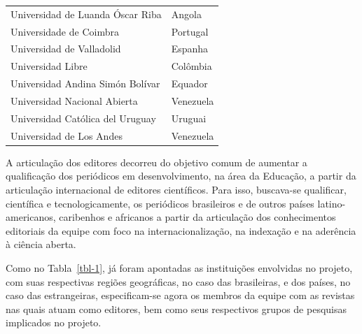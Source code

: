 \documentclass[
  a4paper,
]{book}
\begin{document}
\begin{longtable}[]{@{}ll@{}}
Universidad de Luanda Óscar Riba & Angola \\
Universidade de Coimbra & Portugal \\
Universidad de Valladolid & Espanha \\
Universidad Libre & Colômbia \\
Universidad Andina Simón Bolívar & Equador \\
Universidad Nacional Abierta & Venezuela \\
Universidad Católica del Uruguay & Uruguai \\
Universidad de Los Andes & Venezuela \\
\end{longtable}

A articulação dos editores decorreu do objetivo comum de aumentar a
qualificação dos periódicos em desenvolvimento, na área da Educação, a
partir da articulação internacional de editores científicos. Para isso,
buscava-se qualificar, científica e tecnologicamente, os periódicos
brasileiros e de outros países latino-americanos, caribenhos e africanos
a partir da articulação dos conhecimentos editoriais da equipe com foco
na internacionalização, na indexação e na aderência à ciência aberta.

Como no Tabla~\ref{tbl-1}, já foram apontadas as instituições envolvidas
no projeto, com suas respectivas regiões geográficas, no caso das
brasileiras, e dos países, no caso das estrangeiras, especificam-se
agora os membros da equipe com as revistas nas quais atuam como
editores, bem como seus respectivos grupos de pesquisas implicados no
projeto.
\end{document}
